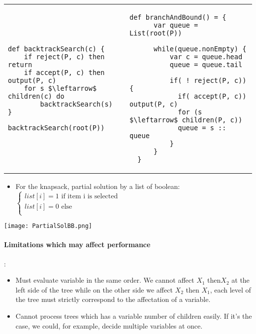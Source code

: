 \begin{tabular}{m{8cm}m{8cm}}
\begin{lstlisting}[mathescape, caption=BB with recursion]
def backtrackSearch(c) {
    if reject(P, c) then return
    if accept(P, c) then output(P, c)
    for s $\leftarrow$ children(c) do
        backtrackSearch(s)
}

backtrackSearch(root(P))
\end{lstlisting}
&
\begin{lstlisting}[mathescape, caption=BB with stack]
  def branchAndBound() = {
      var queue = List(root(P))

      while(queue.nonEmpty) {
          var c = queue.head
          queue = queue.tail

          if( ! reject(P, c)) {
            if( accept(P, c)) output(P, c)
            for (s $\leftarrow$ children(P, c))
            queue = s :: queue
          }
      }
  }
  \end{lstlisting}
\end{tabular}


\begin{itemize}
    \item For the knapsack, partial solution by a list of boolean: 
        $\begin{cases} 
            list[i]= 1 \text{ if item i is selected}\\
            list[i]= 0 \text{ else}\\
        \end{cases}$
\end{itemize}

\begin{center}
\texttt{[image: PartialSolBB.png]}
\end{center}

\paragraph{Limitations which may affect performance}:
\begin{itemize}
    \item Must evaluate variable in the same order. We cannot affect $X_1$
        then$ X_2$ at the left side of the tree while on the other side we
        affect $X_2$ then $X_1$, each level of the tree must strictly
        correspond to the affectation of a variable.

    \item Cannot process trees which has a variable number of children easily.
        If it's the case, we could, for example, decide multiple variables at once.
\end{itemize}

